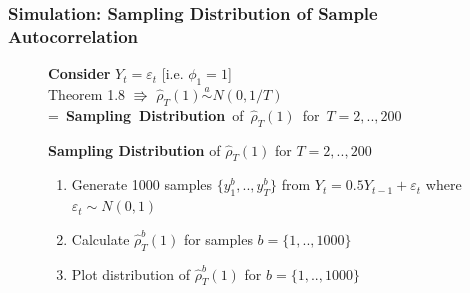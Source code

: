 \documentclass{beamer}
\makeatletter
\newcommand{\mybox}[1]{%
	\setbox0=\hbox{#1}%
	\setlength{\@tempdima}{\dimexpr\wd0+13pt}%
	\begin{tcolorbox}[colframe=ikb, colback=aliceblue ,boxrule=0.5pt,arc=4pt,
		left=6pt,right=6pt,top=6pt,bottom=6pt,boxsep=0pt,width=\@tempdima]
		#1
	\end{tcolorbox}
}
\makeatother
\begin{document}
\begin{frame}

\begin{figure}
\hspace{-6cm}	



\end{figure}

\end{frame}






\begin{frame}
\vspace{-3cm}
\begin{center} 
\frametitle{ Simulation:  Sampling Distribution of Sample Autocorrelation }
\end{center}
\begin{figure}
\begin{minipage}[c]{0.4\textwidth}
\end{minipage}  \quad \begin{minipage}[c]{0.5\textwidth}
\vspace{1cm}

\textbf{Consider} $Y_t=\varepsilon_t$ [i.e. $\phi_1=1$]\\
\vspace{5pt}
Theorem 1.8 $\Rrightarrow$ $\hat{\rho}_T(1)\overset{a}{\sim} N(0,1/T)$
\vspace{1cm}
\mybox{	 \textbf{Sampling Distribution} of $\hat{\rho}_{T}(1)$ for $T=2,..,200$}
\vspace{10pt}\pause
\begin{enumerate}	
\item Generate 1000 samples $\{y_1^b,..,y_T^b\}$ from $Y_t=0.5Y_{t-1} +\varepsilon_t$ where $\varepsilon_t \sim N(0,1)$
\vspace{1cm} \pause
\item Calculate $\hat{\rho}_{T}^b(1)$	for  samples $b=\{1,..,1000\}$  

\vspace{1cm}
\pause

\item	Plot distribution of   $\hat{\rho}_{T}^b(1)$ for  $b=\{1,..,1000\}$  

\end{enumerate}

\end{minipage}
\end{figure}

\end{frame}
	
\end{document}
